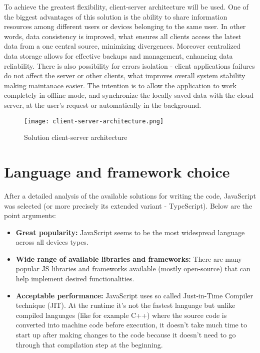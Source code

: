 To achieve the greatest flexibility, client-server architecture will be used. One of the biggest advantages of this solution is the ability to share information resources among different users or devices belonging to the same user. In other words, data consistency is improved, what ensures all clients access the latest data from a one central source, minimizing divergences. Moreover centralized data storage allows for effective backups and management, enhancing data reliability. There is also possibility for errors isolation - client applications failures do not affect the server or other clients, what improves overall system stability making maintanace easier.
The intention is to allow the application to work completely in offline mode, and synchronize the locally saved data with the cloud server, at the user's request or automatically in the background. 

\begin{figure}[H]
    \centering
    \texttt{[image: client-server-architecture.png]}
    \caption[Solution Architecture]{\label{fig:architecture} Solution client-server architecture }
\end{figure}

 

\section{{Language and framework choice}}

After a detailed analysis of the available solutions for writing the code, JavaScript was selected (or more precisely its extended variant - TypeScript). Below are the point arguments:

\begin{itemize}
  \item \textbf{Great popularity:} JavaScript seems to be the most widespread language across all devices types.
  \item \textbf{Wide range of available libraries and frameworks:} There are many popular JS libraries and frameworks available (mostly open-source) that can help implement desired functionalities.
  \item \textbf{Acceptable performance:} JavaScript uses so called Just-in-Time Compiler technique (JIT)\autocite{JIT}. At the runtime it's not the fastest language but unlike compiled languages (like for example C++) where the source code is converted into machine code before execution, it doesn't take much time to start up after making changes to the code because it doesn't need to go through that compilation step at the beginning.
\end{itemize}

